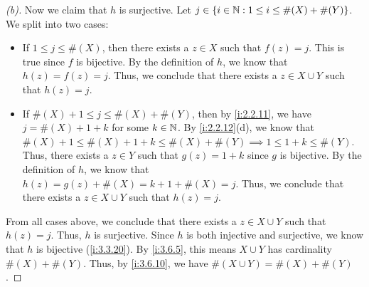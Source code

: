 \begin{proof}[(b)]
  Now we claim that \(h\) is surjective.
  Let \(j \in \left\lbrace i \in \mathbb{N} : 1 \leq i \leq \#(X) + \#(Y)\right\rbrace\).
  We split into two cases:
  \begin{itemize}
    \item If \(1 \leq j \leq \#(X)\), then there exists a \(z \in X\) such that \(f(z) = j\).
          This is true since \(f\) is bijective.
          By the definition of \(h\), we know that \(h(z) = f(z) = j\).
          Thus, we conclude that there exists a \(z \in X \cup Y\) such that \(h(z) = j\).
    \item If \(\#(X) + 1 \leq j \leq \#(X) + \#(Y)\), then by \cref{i:2.2.11}, we have \(j = \#(X) + 1 + k\) for some \(k \in \mathbb{N}\).
          By \cref{i:2.2.12}(d), we know that \(\#(X) + 1 \leq \#(X) + 1 + k \leq \#(X) + \#(Y) \implies 1 \leq 1 + k \leq \#(Y)\).
          Thus, there exists a \(z \in Y\) such that \(g(z) = 1 + k\) since \(g\) is bijective.
          By the definition of \(h\), we know that \(h(z) = g(z) + \#(X) = k + 1 + \#(X) = j\).
          Thus, we conclude that there exists a \(z \in X \cup Y\) such that \(h(z) = j\).
  \end{itemize}
  From all cases above, we conclude that there exists a \(z \in X \cup Y\) such that \(h(z) = j\).
  Thus, \(h\) is surjective.
  Since \(h\) is both injective and surjective, we know that \(h\) is bijective (\cref{i:3.3.20}).
  By \cref{i:3.6.5}, this means \(X \cup Y\) has cardinality \(\#(X) + \#(Y)\).
  Thus, by \cref{i:3.6.10}, we have \(\#(X \cup Y) = \#(X) + \#(Y)\).
\end{proof}

